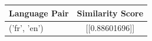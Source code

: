 \begin{tabular}{|l|c|}
\hline
Language Pair & Similarity Score \\
\hline
('fr', 'en') & [[0.88601696]] \\
\hline
\end{tabular}

